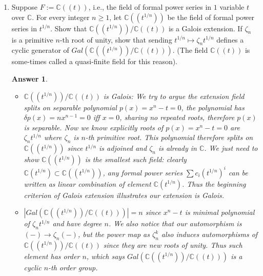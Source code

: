 \documentclass[11pt,leqno]{article}
\newcommand{\cplx}{{\mathbb C}}
\newcommand{\<}[1]{{\langle}#1 {\rangle}}
\theoremstyle{plain}
\newtheorem*{answer*}{Answer}
\theoremstyle{definition}
\theoremstyle{remark}
\numberwithin{equation}{section}
\begin{document}
\begin{enumerate}
\item Suppose $F := \cplx((t))$, i.e., the field of formal power series in $1$ variable $t$ over $\cplx$.  For every integer $n \geq 1$, let $\cplx((t^{1/n}))$ be the field of formal power series in $t^{1/n}$.  Show that $\cplx((t^{1/n}))/\cplx((t))$ is a Galois extension.  If $\zeta_n$ is a primitive $n$-th root of unity, show that sending $t^{1/n} \mapsto \zeta_n t^{1/n}$ defines a cyclic generator of $Gal(\cplx((t^{1/n}))/\cplx((t)))$. (The field $\cplx((t))$ is some-times called a quasi-finite field for this reason).
    \begin{answer*}
        \begin{itemize}*
            \item [i)] $\cplx((t^{1/n}))/\cplx((t))$ is Galois: We try to argue the extension field splits on separable polynomial $p(x)=x^n-t=0$, the polynomial has $\delta p(x)=nx^{n-1}=0$ iff $x=0$, sharing no repeated roots, therefore $p(x)$ is separable. Now we know explicitly roots of $p(x)=x^n-t=0$ are $\zeta_n t^{1/n}$ where $\zeta_n$ is $n$-th primitive root. This polynomial therefore splits on $\cplx((t^{1/n}))$ since $t^{1/n}$ is adjoined and $\zeta_n$ is already in $\cplx$. We just need to show $\cplx((t^{1/n}))$ is the smallest such field: clearly $\cplx(t^{1/n})\subset \cplx((t^{1/n}))$, any formal power series $\sum c_i(t^{1/n})^i$ can be written as linear combination of element $\cplx(t^{1/n})$. Thus the beginning criterion of Galois extension illustrates our extension is Galois.
            
            \item[ii)]  $|Gal(\cplx((t^{1/n}))/\cplx((t)))|=n$ since $x^n-t$ is minimal polynomial of $\zeta_nt^{1/n}$ and have degree $n$. We also notice that our automorphism is $(-)\rightarrow \zeta_n(-)$, but the power map as  $\zeta_n^k$ also induces automorphisms of $\cplx((t^{1/n}))/\cplx((t))$ since they are new roots of unity. Thus such element has order $n$, which says $Gal(\cplx((t^{1/n}))/\cplx((t)))$ is a cyclic $n$-th order group.
             
        \end{itemize}
    \end{answer*}
    
    
    


\end{enumerate}
\end{document}
